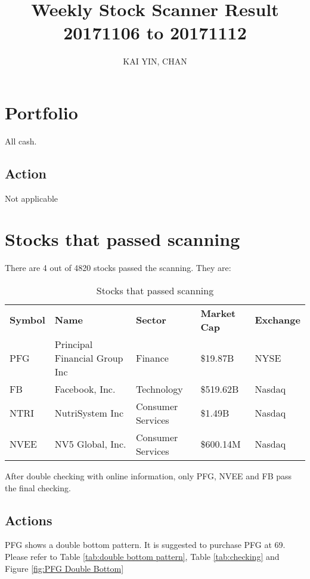 \documentclass{article}
\begin{document}
\title{Weekly Stock Scanner Result \\ 20171106 to 20171112}
\author{KAI YIN, CHAN}
\maketitle

\section{Portfolio}
All cash.

\subsection{Action}
Not applicable

\section{Stocks that passed scanning}

There are 4 out of 4820 stocks passed the scanning.  They are:
\begin{table}[htbp]
  \caption{Stocks that passed scanning}
    \begin{tabular}{lllll}
    \textbf{Symbol} & \textbf{Name} & \textbf{Sector} & \textbf{Market Cap} & \textbf{Exchange} \\
    PFG   & Principal Financial Group Inc & Finance & \$19.87B & NYSE \\
    FB    & Facebook, Inc. & Technology & \$519.62B & Nasdaq \\
    NTRI  & NutriSystem Inc & Consumer Services & \$1.49B & Nasdaq \\
    NVEE  & NV5 Global, Inc. & Consumer Services & \$600.14M & Nasdaq \\
    \end{tabular}%
  \label{tab:addlabel}%
\end{table}%

After double checking with online information, only PFG, NVEE and FB pass the final checking.

\subsection{Actions}
PFG shows a double bottom pattern. It is suggested to purchase PFG at 69. Please refer to Table \ref{tab:double bottom pattern}, Table \ref{tab:checking} and Figure \ref{fig:PFG Double Bottom}
\end{document}
